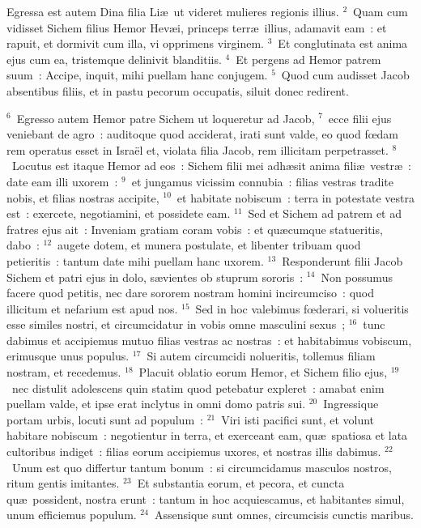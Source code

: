\lettrine[lines=3,image=true,loversize=0.05,lraise=-0.03]{E}{}gressa est autem Dina filia Li\ae\ ut videret mulieres regionis illius.
${}^{2}$~Quam cum vidisset Sichem filius Hemor Hev\ae i, princeps terr\ae\ illius, adamavit eam~: et rapuit, et dormivit cum illa, vi opprimens virginem.
${}^{3}$~Et conglutinata est anima ejus cum ea, tristemque delinivit blanditiis.
${}^{4}$~Et pergens ad Hemor patrem suum~: Accipe, inquit, mihi puellam hanc conjugem.
${}^{5}$~Quod cum audisset Jacob absentibus filiis, et in pastu pecorum occupatis, siluit donec redirent.


${}^{6}$~Egresso autem Hemor patre Sichem ut loqueretur ad Jacob,
${}^{7}$~ecce filii ejus veniebant de agro~: auditoque quod acciderat, irati sunt valde, eo quod fœdam rem operatus esset in Isra\"el et, violata filia Jacob, rem illicitam perpetrasset.
${}^{8}$~Locutus est itaque Hemor ad eos~: Sichem filii mei adh\ae sit anima fili\ae\ vestr\ae~: date eam illi uxorem~:
${}^{9}$~et jungamus vicissim connubia~: filias vestras tradite nobis, et filias nostras accipite,
${}^{10}$~et habitate nobiscum~: terra in potestate vestra est~: exercete, negotiamini, et possidete eam.
${}^{11}$~Sed et Sichem ad patrem et ad fratres ejus ait~: Inveniam gratiam coram vobis~: et qu\ae cumque statueritis, dabo~:
${}^{12}$~augete dotem, et munera postulate, et libenter tribuam quod petieritis~: tantum date mihi puellam hanc uxorem.
${}^{13}$~Responderunt filii Jacob Sichem et patri ejus in dolo, s\ae vientes ob stuprum sororis~:
${}^{14}$~Non possumus facere quod petitis, nec dare sororem nostram homini incircumciso~: quod illicitum et nefarium est apud nos.
${}^{15}$~Sed in hoc valebimus fœderari, si volueritis esse similes nostri, et circumcidatur in vobis omne masculini sexus~;
${}^{16}$~tunc dabimus et accipiemus mutuo filias vestras ac nostras~: et habitabimus vobiscum, erimusque unus populus.
${}^{17}$~Si autem circumcidi nolueritis, tollemus filiam nostram, et recedemus.
${}^{18}$~Placuit oblatio eorum Hemor, et Sichem filio ejus,
${}^{19}$~nec distulit adolescens quin statim quod petebatur expleret~: amabat enim puellam valde, et ipse erat inclytus in omni domo patris sui.
${}^{20}$~Ingressique portam urbis, locuti sunt ad populum~:
${}^{21}$~Viri isti pacifici sunt, et volunt habitare nobiscum~: negotientur in terra, et exerceant eam, qu\ae\ spatiosa et lata cultoribus indiget~: filias eorum accipiemus uxores, et nostras illis dabimus.
${}^{22}$~Unum est quo differtur tantum bonum~: si circumcidamus masculos nostros, ritum gentis imitantes.
${}^{23}$~Et substantia eorum, et pecora, et cuncta qu\ae\ possident, nostra erunt~: tantum in hoc acquiescamus, et habitantes simul, unum efficiemus populum.
${}^{24}$~Assensique sunt omnes, circumcisis cunctis maribus.


